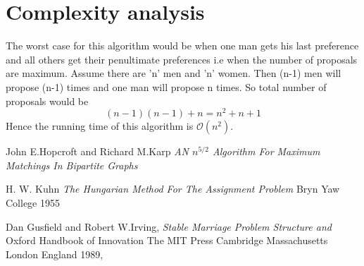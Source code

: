 \documentclass[a4paper]{report}
\theoremstyle{definition}
\begin{document}
\section{Complexity analysis}
The worst case for this algorithm would be when one man gets his last preference and all others get their penultimate preferences i.e when the number of proposals are maximum. Assume there are 'n' men and 'n' women. Then (n-1) men will propose (n-1) times and one man will propose n times. So total number of proposals would be $$(n-1)(n-1) + n = n^2 + n + 1$$
Hence the running time of this algorithm is $\mathcal{O}(n^2)$.

 
    


\begin{thebibliography}{9}

John E.Hopcroft
and 
Richard M.Karp
  \emph{AN $n^{5/2}$ Algorithm For Maximum Matchings
In Bipartite Graphs}

H.
W.
Kuhn
\emph{The Hungarian Method For The
Assignment Problem}
Bryn Yaw College 1955


Dan Gusfield and Robert W.Irving,
\emph{Stable Marriage Problem Structure and}
Oxford Handbook of Innovation
The MIT Press
Cambridge Massachusetts London England
1989,


\end{thebibliography}
\end{document}
